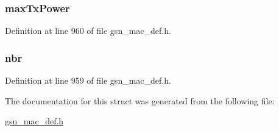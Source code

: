 \hypertarget{a00114_a7cd081227ed796284bdbaf79788a39a5}{
\subsubsection[{maxTxPower}]{ {\bf maxTxPower}}}
\label{a00114_a7cd081227ed796284bdbaf79788a39a5}


Definition at line 960 of file gsn\_\-mac\_\-def.h.

\hypertarget{a00114_a5e8cc5c50451b8cd569f6b857ca93729}{
\subsubsection[{nbr}]{ {\bf nbr}}}
\label{a00114_a5e8cc5c50451b8cd569f6b857ca93729}


Definition at line 959 of file gsn\_\-mac\_\-def.h.



The documentation for this struct was generated from the following file:\begin{DoxyCompactItemize}
\item 
\hyperlink{a00522}{gsn\_\-mac\_\-def.h}\end{DoxyCompactItemize}
